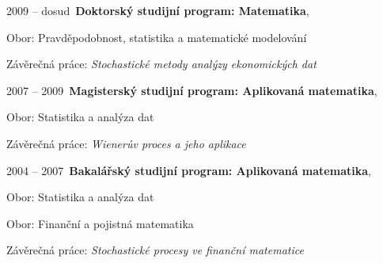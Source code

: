\documentclass[10pt]{article}
\newenvironment{outerlist}[0]%
        {\begin{itemize}}
	{\end{itemize}
         \vspace{-.6\baselineskip}}
\newenvironment{innerlist}[0]%
        {\begin{compactitem}}
	{\end{compactitem}}
\begin{document}
\begin{outerlist}
   \item[] 2009 -- dosud\ \textbf{Doktorský studijní program: Matematika},
	  \begin{innerlist}
	    \item[] Obor: Pravděpodobnost, statistika a matematické modelování
	    \item Závěrečná práce: \emph{Stochastické metody analýzy ekonomických dat} %
	  \end{innerlist}

  \item[] 2007 -- 2009\ \textbf{Magisterský studijní program: Aplikovaná matematika},
	  \begin{innerlist}
	    \item[] Obor: Statistika a analýza dat
	    \item Závěrečná práce: \emph{Wienerův proces a jeho aplikace} %
             \end{innerlist}

  \item[] 2004 -- 2007\ \textbf{Bakalářský studijní program: Aplikovaná matematika},
	  \begin{innerlist}
	    \item[] Obor: Statistika a analýza dat
               \item[] Obor: Finanční a pojistná matematika	    
               \item Závěrečná práce: \emph{Stochastické procesy ve finanční matematice} \hfill \\
             \end{innerlist}

\end{outerlist}
\end{document}
